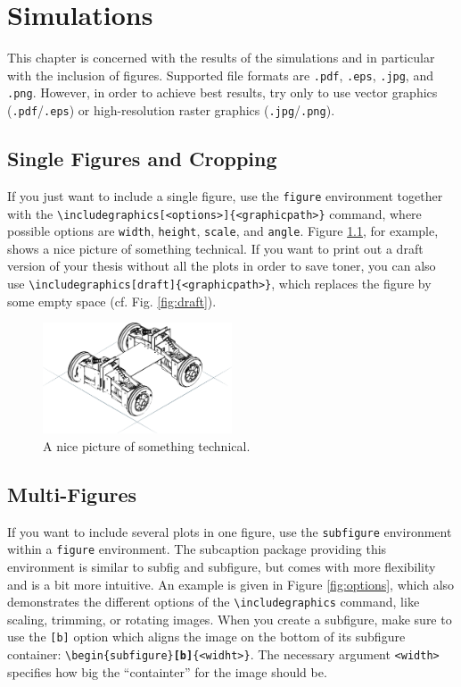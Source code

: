 \chapter{Simulations}
\thispagestyle{empty}
This chapter is concerned with the results of the simulations and in particular with the inclusion of figures. Supported file formats are \texttt{.pdf}, \texttt{.eps}, \texttt{.jpg}, and \texttt{.png}. However, in order to achieve best results, try only to use vector graphics (\texttt{.pdf}/\texttt{.eps}) or high-resolution raster graphics (\texttt{.jpg}/\texttt{.png}).

\section{Single Figures and Cropping}
If you just want to include a single figure, use the \texttt{figure} environment together with the \texttt{\textbackslash includegraphics[<options>]\{<graphicpath>\}} command, where possible options are \texttt{width}, \texttt{height}, \texttt{scale}, and \texttt{angle}. Figure \ref{fig:trak}, for example, shows a nice picture of something technical. If you want to print out a draft version of your thesis without all the plots in order to save toner, you can also use \texttt{\textbackslash includegraphics[draft]\{<graphicpath>\}}, which replaces the figure by some empty space (cf. Fig. \ref{fig:draft}).

\begin{figure}
\centering
\includegraphics[width=0.5\textwidth]{figures/trak_skeleton}
\caption[Including an image with \texttt{\textbackslash includegraphics}]{A nice picture of something technical.}
\label{fig:trak}
\end{figure}

\section{Multi-Figures}
If you want to include several plots in one figure, use the \texttt{subfigure} environment within a \texttt{figure} environment. The subcaption package providing this environment is similar to subfig and subfigure, but comes with more flexibility and is a bit more intuitive. An example is given in Figure \ref{fig:options}, which also demonstrates the different options of the \texttt{\textbackslash includegraphics} command, like scaling, trimming, or rotating images. When you create a subfigure, make sure to use the \texttt{[b]} option which aligns the image on the bottom of its subfigure container: \texttt{\textbackslash begin\{subfigure\}\textbf{[b]}\{<widht>\}}. The necessary argument \texttt{<width>} specifies how big the ``containter'' for the image should be. 

